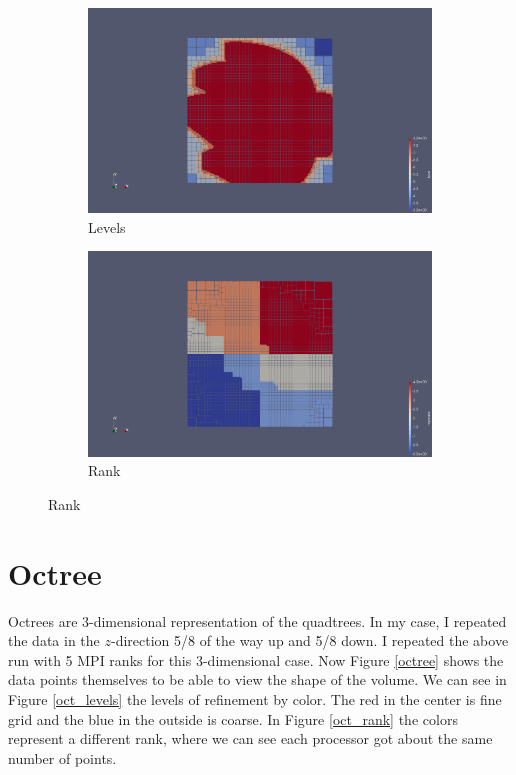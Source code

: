 \documentclass[12pt,letterpaper]{article}
\begin{document}
\begin{figure}[ht]
\centering
\caption{Quadtree}
\label{quadtree}
\begin{subfigure}[b]{0.45\textwidth}
\caption{Levels}
\label{quad_levels}
\includegraphics[width=\textwidth]{quad_level.png}
\end{subfigure}
\begin{subfigure}[b]{0.45\textwidth}
\caption{Rank}
\label{quad_rank}
\includegraphics[width=\textwidth]{quad_rank.png}
\end{subfigure}
\end{figure}

\section{Octree}

Octrees are 3-dimensional representation of the quadtrees. In my case, I repeated the data in the $z$-direction 5/8 of the way up and 5/8 down. I repeated the above run with 5 MPI ranks for this 3-dimensional case. Now Figure \ref{octree} shows the data points themselves to be able to view the shape of the volume. We can see in Figure \ref{oct_levels} the levels of refinement by color. The red in the center is fine grid and the blue in the outside is coarse. In Figure \ref{oct_rank} the colors represent a different rank, where we can see each processor got about the same number of points.
\end{document}
